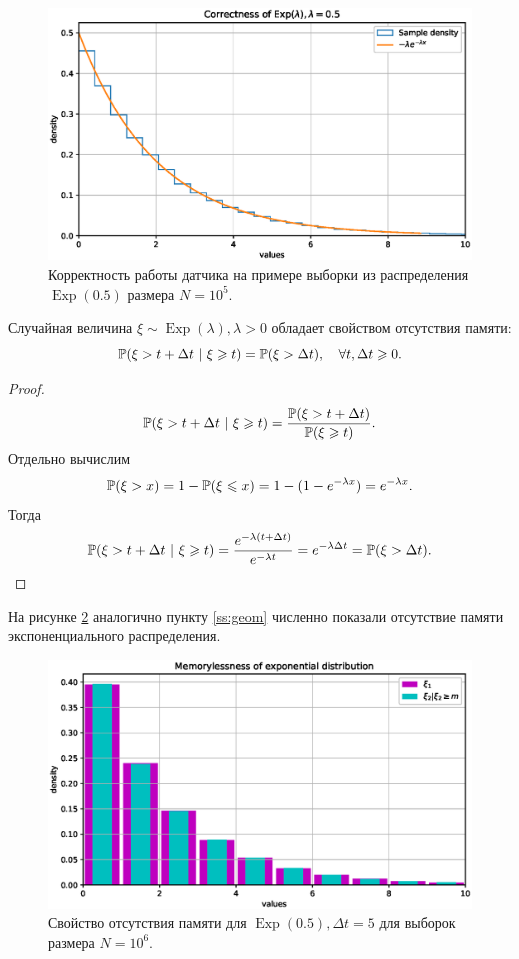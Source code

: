 \documentclass[11pt]{report}
\DeclareMathOperator{\Exp}{Exp}
\begin{document}
\begin{figure}[H]
    \centering
    \includegraphics[width=0.9\linewidth]{images/expo.eps}
    \caption{Корректность работы датчика на примере выборки из распределения $\Exp(0.5)$ размера $N=10^5$.}
    \label{fig:expo}
\end{figure}

\begin{statement}
Случайная величина $\xi\sim\Exp(\lambda),\lambda>0$ обладает свойством отсутствия памяти:
$$
\mathbb{P}(\xi > t+\Delta t ~|~ \xi \geqslant t) = \mathbb{P}(\xi > \Delta t),\quad \forall t,\Delta t \geqslant 0.
$$
\begin{proof}
\begin{gather*}
\mathbb{P}(\xi > t+\Delta t ~|~ \xi \geqslant t) = \dfrac{\mathbb{P}(\xi > t+\Delta t)}{\mathbb{P}(\xi \geqslant t)}.
\end{gather*}
Отдельно вычислим
\begin{gather*}
\mathbb{P}(\xi > x) = 1 - \mathbb{P}(\xi \leqslant x) = 1 - (1 - e^{-\lambda x}) = e^{-\lambda x}.
\end{gather*}
Тогда
$$
\mathbb{P}(\xi > t+\Delta t ~|~ \xi \geqslant t) = \dfrac{e^{-\lambda(t+\Delta t)}}{e^{-\lambda t}} = e^{-\lambda\Delta t} = \mathbb{P}(\xi > \Delta t).
$$
\end{proof}
\end{statement}

На рисунке \ref{fig:expo-memo} аналогично пункту \ref{ss:geom} численно показали отсутствие памяти экспоненциального распределения.

\begin{figure}[H]
    \centering
    \includegraphics[width=0.9\linewidth]{images/expo-memo.eps}
    \caption{Свойство отсутствия памяти для $\Exp(0.5), \Delta t=5$ для выборок размера $N=10^6$.}
    \label{fig:expo-memo}
\end{figure}
\end{document}
